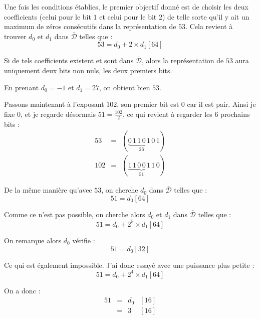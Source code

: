 \documentclass[12pt, a4paper]{memoir}
\begin{document}
Une fois les conditions établies, le premier objectif donné est de choisir les deux coefficients (celui pour le bit $1$
et celui pour le bit $2$) de telle sorte qu'il y ait un maximum de zéros consécutifs dans la représentation de $53$.
Cela revient à trouver $d_0$ et $d_1$ dans $\overline{\mathcal{D}}$ telles que :
\begin{equation}
 53 = d_0 + 2 \times d_1 [64]
\end{equation}

Si de tels coefficients existent et sont dans $\overline{\mathcal{D}}$, alors la représentation de $53$ aura uniquement deux bits non
nuls, les deux premiers bits.

En prenant $d_0 = -1$ et $d_1 = 27$, on obtient bien $53$.

Passons maintenant à l'exposant $102$, son premier bit est $0$ car il est pair.
Ainsi je fixe $0$, et je regarde désormais $51 = \frac{102}{2}$, ce qui revient à regarder les $6$ prochains bits :
  $$\begin{array}{ccc}
53 & = & (\underbrace{0 \, 1 \, 1 \, 0 \, 1 \, 0}_{26} \, 1) \\
102 & = & (\underbrace{1 \, 1 \, 0 \, 0 \, 1 \, 1}_{51} \, 0)
 \end{array}$$

De la même manière qu'avec $53$, on cherche $d_0$ dans $\overline{\mathcal{D}}$ telles que :
\begin{equation}
 51 = d_0 [64]
\end{equation}

Comme ce n'est pas possible, on cherche alors $d_0$ et $d_1$ dans $\overline{\mathcal{D}}$ telles que :
\begin{equation}
 51 = d_0 + 2^5 \times d_1 [64]
\end{equation}
 
On remarque alors $d_0$ vérifie :
\begin{equation}
 51 = d_0 [32]
\end{equation}
 
Ce qui est également impossible.
J'ai donc essayé avec une puissance plus petite :
\begin{equation}
 51 = d_0 + 2^4 \times d_1 [64]
\end{equation}

On a donc :
  $$\begin{array}{cccc}
51 & = & d_0 & [16] \\
\, & = & 3 & [16]
 \end{array}$$
\end{document}
